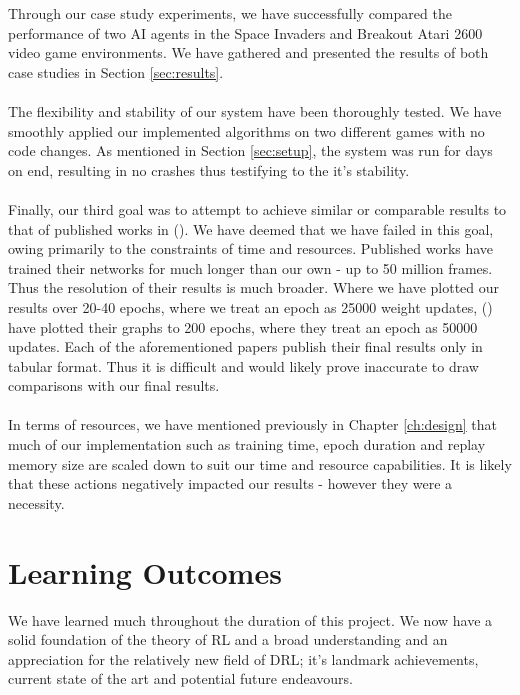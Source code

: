 Through our case study experiments, we have successfully compared the performance of two AI agents in the Space Invaders and Breakout Atari 2600 video game environments. We have gathered and presented the results of both case studies in Section \ref{sec:results}. \paragraph{}

The flexibility and stability of our system have been thoroughly tested. We have smoothly applied our implemented algorithms on two different games with no code changes. As mentioned in Section \ref{sec:setup}, the system was run for days on end, resulting in no crashes thus testifying to the it's stability. \paragraph{}

Finally, our third goal was to attempt to achieve similar or comparable results to that of published works in (\citet{human,doubleq,dueling}). We have deemed that we have failed in this goal, owing primarily to the constraints of time and resources. Published works have trained their networks for much longer than our own - up to 50 million frames. Thus the resolution of their results is much broader. Where we have plotted our results over 20-40 epochs, where we treat an epoch as 25000 weight updates, (\citet{human}) have plotted their graphs to 200 epochs, where they treat an epoch as 50000 updates. Each of the aforementioned papers publish their final results only in tabular format. Thus it is difficult and would likely prove inaccurate to draw comparisons with our final results. \paragraph{}

In terms of resources, we have mentioned previously in Chapter \ref{ch:design} that much of our implementation such as training time, epoch duration and replay memory size are scaled down to suit our time and resource capabilities. It is likely that these actions negatively impacted our results - however they were a necessity.

\section{Learning Outcomes}
We have learned much throughout the duration of this project. We now have a solid foundation of the theory of RL and a broad understanding and an appreciation for the relatively new field of DRL; it's landmark achievements, current state of the art and potential future endeavours. \paragraph{}

